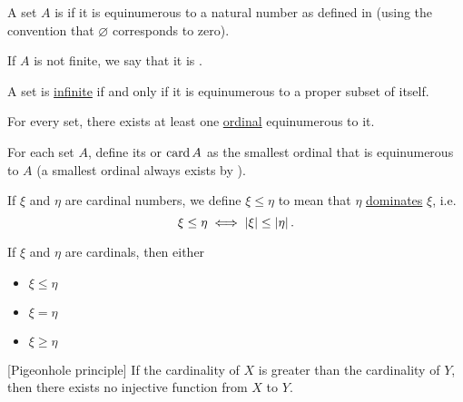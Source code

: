 \begin{definition}\label{def:finite_set}\cite[133]{Enderton1977}
  A set \( A \) is  if it is equinumerous to a natural number as defined in  (using the convention that \( \varnothing \) corresponds to zero).

  If \( A \) is not finite, we say that it is .
\end{definition}

\begin{proposition}\label{thm:infinite_set_iff_equinumerous_to_proper_subset}\cite[Corollary 6D]{Enderton1977}
  A set is \hyperref[def:finite_set]{infinite} if and only if it is equinumerous to a proper subset of itself.
\end{proposition}

\begin{theorem}\label{thm:equinumerous_ordinal_existence}\cite[197]{Enderton1977}
  For every set, there exists at least one \hyperref[def:ordinal]{ordinal} equinumerous to it.
\end{theorem}

\begin{definition}\label{def:cardinal}\cite[197]{Enderton1977}
  For each set \( A \), define its  or  \( \operatorname{card} A \) as the smallest ordinal that is equinumerous to \( A \) (a smallest ordinal always exists by ).

  If \( \xi \) and \( \eta \) are cardinal numbers, we define \( \xi \leq \eta \) to mean that \( \eta \) \hyperref[def:set_domination]{dominates} \( \xi \), i.e.
  \begin{equation*}
    \xi \leq \eta \iff \left\vert \xi \right\vert \leq \left\vert \eta \right\vert.
  \end{equation*}
\end{definition}

\begin{theorem}\label{thm:cardinal_trichotomy}\cite[theorem 6M(5)]{Enderton1977}
  If \( \xi \) and \( \eta \) are cardinals, then either
  \begin{itemize}
    \item \( \xi \leq \eta \)
    \item \( \xi = \eta \)
    \item \( \xi \geq \eta \)
  \end{itemize}
\end{theorem}

\begin{corollary}\label{def:pigeonhole_principle}[Pigeonhole principle]
  If the cardinality of \( X \) is greater than the cardinality of \( Y \), then there exists no injective function from \( X \) to \( Y \).
\end{corollary}

